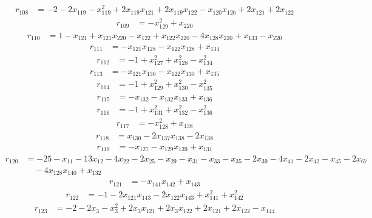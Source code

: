 \begin{align*}
r_{108}&=
-2-2x_{119}-x_{119}^{2}+2x_{119}x_{121}+2x_{119}x_{122}-x_{120}x_{126}+2x_{121}+2x_{122}
\end{align*}
\begin{align*}
r_{109}&=
-x_{129}^{2}+x_{220}
\end{align*}
\begin{align*}
r_{110}&=
1-x_{121}+x_{121}x_{220}-x_{122}+x_{122}x_{220}-4x_{128}x_{220}+x_{133}-x_{220}
\end{align*}
\begin{align*}
r_{111}&=
-x_{121}x_{128}-x_{122}x_{128}+x_{134}
\end{align*}
\begin{align*}
r_{112}&=
-1+x_{127}^{2}+x_{128}^{2}-x_{134}^{2}
\end{align*}
\begin{align*}
r_{113}&=
-x_{121}x_{130}-x_{122}x_{130}+x_{135}
\end{align*}
\begin{align*}
r_{114}&=
-1+x_{129}^{2}+x_{130}^{2}-x_{135}^{2}
\end{align*}
\begin{align*}
r_{115}&=
-x_{132}-x_{132}x_{133}+x_{136}
\end{align*}
\begin{align*}
r_{116}&=
-1+x_{131}^{2}+x_{132}^{2}-x_{136}^{2}
\end{align*}
\begin{align*}
r_{117}&=
-x_{128}^{2}+x_{138}
\end{align*}
\begin{align*}
r_{118}&=
x_{130}-2x_{137}x_{138}-2x_{138}
\end{align*}
\begin{align*}
r_{119}&=
-x_{127}-x_{129}x_{139}+x_{131}
\end{align*}
\begin{align*}
r_{120}&=
-25-x_{11}-13x_{12}-4x_{22}-2x_{25}-x_{29}-x_{31}-x_{33}-x_{35}-2x_{39}-4x_{41}-2x_{42}-x_{45}-2x_{67} \\
&\quad -4x_{128}x_{140}+x_{132}
\end{align*}
\begin{align*}
r_{121}&=
-x_{141}x_{142}+x_{143}
\end{align*}
\begin{align*}
r_{122}&=
-1-2x_{121}x_{143}-2x_{122}x_{143}+x_{141}^{2}+x_{142}^{2}
\end{align*}
\begin{align*}
r_{123}&=
-2-2x_{3}-x_{3}^{2}+2x_{3}x_{121}+2x_{3}x_{122}+2x_{121}+2x_{122}-x_{144}
\end{align*}
